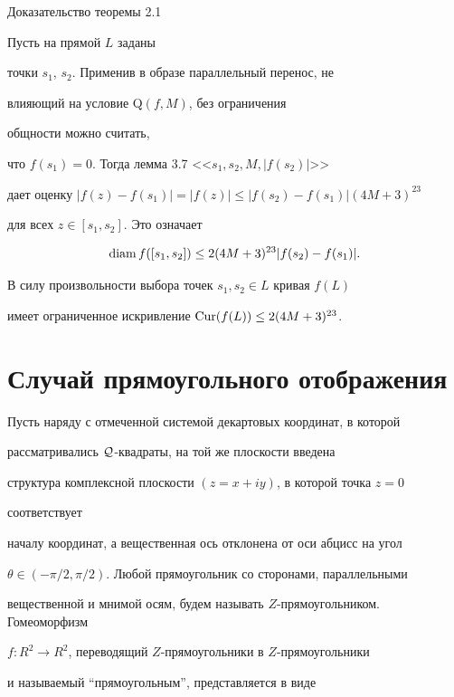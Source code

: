 \begin{pf*}{Доказательство теоремы 2.1}


Пусть на прямой $L$ заданы 


точки $s_1$, $s_2$. Применив в образе параллельный перенос, не 


влияющий на условие Q$(f, M)$, без ограничения 


общности можно считать,


что $f(s_1) = 0$. Тогда лемма 3.7 <<$s_1, s_2, M, |f(s_2)|$>> 


дает оценку $|f(z) - f(s_1)| = |f(z)|\leq |f(s_2) - f(s_1)| (4M+3)^{23}$


для всех $z\in [s_1, s_2]$. Это означает


$$


\diam f([s_1, s_2]) \leq 2(4M+3)^{23} |f(s_2) - f(s_1)|.


$$


В силу произвольности выбора точек $s_1, s_2 \in L$ кривая $f(L)$ 


имеет ограниченное искривление $\operatorname{Cur}(f(L)) \leq 2(4M+3)^{23}$. 


\end{pf*}





\section{Случай прямоугольного отображения}





Пусть наряду с отмеченной системой декартовых координат, в которой 


рассматривались ${\cal Q}$-квадраты, на той же плоскости введена 


структура комплексной плоскости $(z=x+iy)$, в которой точка $z=0$ 


соответствует 


началу координат, а вещественная ось отклонена от оси абцисс на угол 


$\theta \in (-\pi/2, \pi/2)$. Любой прямоугольник со сторонами, параллельными 


вещественной и мнимой осям, будем называть $Z$-прямоугольником. Гомеоморфизм 


$f: R^2 \to R^2$, переводящий $Z$-прямоугольники в $Z$-прямоугольники 


и называемый ``прямоугольным'', представляется в виде 


